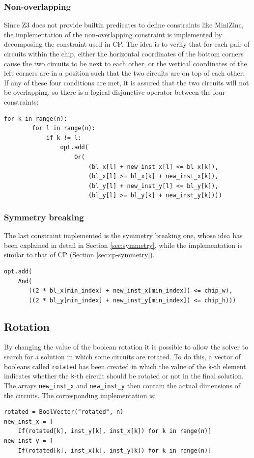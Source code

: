 \documentclass[a4paper, 12pt]{article}
\begin{document}
\subsubsection{Non-overlapping}
Since Z3 does not provide builtin predicates to define constraints like MiniZinc, the implementation of the non-overlapping constraint is implemented by decomposing the constraint used in CP. The idea is to verify that for each pair of circuits within the chip, either the horizontal coordinates of the bottom corners cause the two circuits to be next to each other, or the vertical coordinates of the left corners are in a position such that the two circuits are on top of each other. If any of these four conditions are met, it is assured that the two circuits will not be overlapping, so there is a logical disjunctive operator between the four constraints:
\begin{verbatim}
for k in range(n):
        for l in range(n):
            if k != l:
                opt.add(
                    Or(
                        (bl_x[l] + new_inst_x[l] <= bl_x[k]),
                        (bl_x[l] >= bl_x[k] + new_inst_x[k]),
                        (bl_y[l] + new_inst_y[l] <= bl_y[k]),
                        (bl_y[l] >= bl_y[k] + new_inst_y[k])))
\end{verbatim}

\subsubsection{Symmetry breaking}
The last constraint implemented is the symmetry breaking one, whose idea has been explained in detail in Section \ref{sec:symmetry}, while the implementation is similar to that of CP (Section \ref{sec:cp-symmetry}).
\begin{verbatim}
opt.add(
    And(
       ((2 * bl_x[min_index] + new_inst_x[min_index]) <= chip_w),
       ((2 * bl_y[min_index] + new_inst_y[min_index]) <= chip_h)))
\end{verbatim}

\subsection{Rotation}
By changing the value of the boolean rotation it is possible to allow the solver to search for a solution in which some circuits are rotated. To do this, a vector of booleans called \verb|rotated| has been created in which the value of the \verb|k|-th element indicates whether the \verb|k|-th circuit should be rotated or not in the final solution. The arrays \verb|new_inst_x| and \verb|new_inst_y| then contain the actual dimensions of the circuits. The corresponding implementation is:
\begin{verbatim}
rotated = BoolVector("rotated", n)
new_inst_x = [
    If(rotated[k], inst_y[k], inst_x[k]) for k in range(n)]
new_inst_y = [
    If(rotated[k], inst_x[k], inst_y[k]) for k in range(n)]
\end{verbatim}
\end{document}
